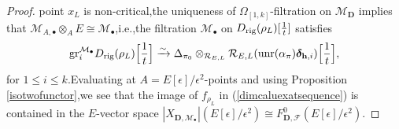 \documentclass[SecEq,CM,GP]{degruyter-crelle} %
\theoremstyle{plain}
\newcommand{\Dpik}{{\mathbf{D}}}
\newcommand{\gr}{{\rm gr}}
\newcommand{\omepik}{\Omega_{[1,k]}}
\newcommand{\rig}{{\rm rig}}
\newcommand{\unr}{{\rm unr}}
\newcommand{\univer}{{\rm univ}}
\newcommand{\wte}{{\widehat{\otimes}}}
\newcommand{\bh}{{\mathbf{h}}}
\newcommand{\co}{\mathcal O}
\newcommand{\cR}{\mathcal R}
\newcommand{\cM}{\mathcal M}
\newcommand{\cF}{\mathcal F}
\begin{document}
\begin{proof}
point $x_L$ is non-critical,\;the uniqueness of $\omepik$-filtration on $\cM_\Dpik$ implies that $\cM_{A,\bullet}\otimes_AE\cong \cM_{\bullet}$,\;i.e.,\;the filtration $\cM_{\bullet}$ on $D_{\rig}(\rho_L)[\frac{1}{t}]$ satisfies
\[\gr_i^{\cM_\bullet}D_{\rig}(\rho_L)\Big[\frac{1}{t}\Big]\xrightarrow{\sim}\Delta_{\pi_0}\otimes_{\cR_{E,L}}\cR_{E,L}(\unr(\alpha_\pi )\bm{\delta}_{\bh,i})\Big[\frac{1}{t}\Big],\]
for $1\leq i\leq k$.\;Evaluating at $A=E[\epsilon]/\epsilon^2$-points and using Proposition \ref{isotwofunctor},\;we see that the image of $f_{\rho_L}$ in (\ref{dimcaluexatsequence}) is contained in the $E$-vector space $|X_{\Dpik,\cM_{\bullet}}|(E[\epsilon]/\epsilon^2)\cong F_{\Dpik,\cF}^0(E[\epsilon]/\epsilon^2)$.\;


\end{proof}
\end{document}
